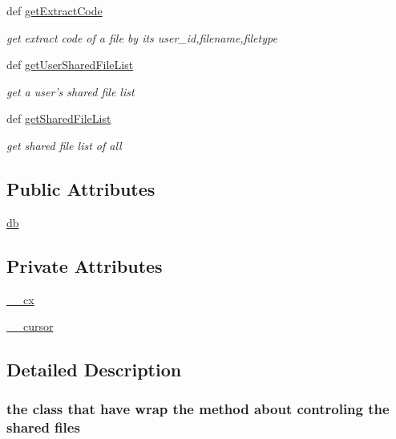 \begin{DoxyCompactItemize}
def \hyperlink{classweb_1_1shared_file_1_1shared_files_a32805d78bd364f82c485e7b650bd02c0}{get\-Extract\-Code}
\begin{DoxyCompactList}\small\item\em get extract code of a file by its user\-\_\-id,filename,filetype \end{DoxyCompactList}\item 
def \hyperlink{classweb_1_1shared_file_1_1shared_files_a306e98237ec87ca71f35ebabf20f7301}{get\-User\-Shared\-File\-List}
\begin{DoxyCompactList}\small\item\em get a user's shared file list \end{DoxyCompactList}\item 
def \hyperlink{classweb_1_1shared_file_1_1shared_files_a710188d318a60c6e4d8dd841eaba3a7f}{get\-Shared\-File\-List}
\begin{DoxyCompactList}\small\item\em get shared file list of all \end{DoxyCompactList}\end{DoxyCompactItemize}
\subsection*{Public Attributes}
\begin{DoxyCompactItemize}
\item 
\hyperlink{classweb_1_1shared_file_1_1shared_files_a8ee408cb0bc43c60c5274f7d44e49391}{db}
\end{DoxyCompactItemize}
\subsection*{Private Attributes}
\begin{DoxyCompactItemize}
\item 
\hyperlink{classweb_1_1shared_file_1_1shared_files_aac40ba4b81960d0e32655f143946f728}{\-\_\-\-\_\-cx}
\item 
\hyperlink{classweb_1_1shared_file_1_1shared_files_a6ff1f50881c0f681cb76284dfc13c05d}{\-\_\-\-\_\-cursor}
\end{DoxyCompactItemize}


\subsection{Detailed Description}
\subsubsection*{the class that have wrap the method about controling the shared files }

